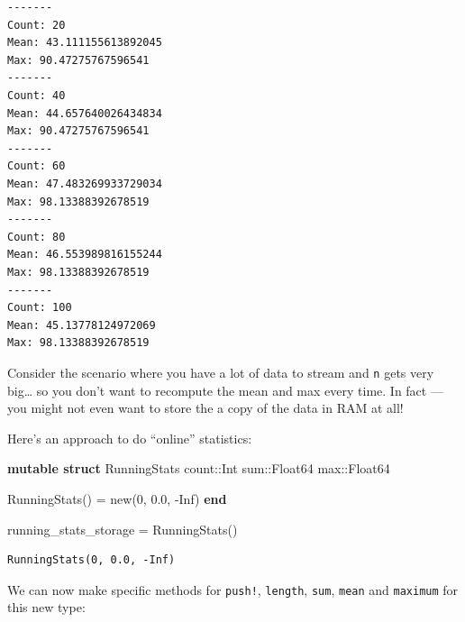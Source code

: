 \documentclass[
]{article}
\newenvironment{Shaded}{\begin{snugshade}}{\end{snugshade}}
\newcommand{\ConstantTok}[1]{\textcolor[rgb]{0.56,0.35,0.01}{#1}}
\newcommand{\DataTypeTok}[1]{\textcolor[rgb]{0.68,0.00,0.00}{#1}}
\newcommand{\FloatTok}[1]{\textcolor[rgb]{0.68,0.00,0.00}{#1}}
\newcommand{\FunctionTok}[1]{\textcolor[rgb]{0.28,0.35,0.67}{#1}}
\newcommand{\KeywordTok}[1]{\textcolor[rgb]{0.00,0.23,0.31}{\textbf{#1}}}
\newcommand{\NormalTok}[1]{\textcolor[rgb]{0.00,0.23,0.31}{#1}}
\newcommand{\OperatorTok}[1]{\textcolor[rgb]{0.37,0.37,0.37}{#1}}
\begin{document}
\begin{verbatim}
-------
Count: 20
Mean: 43.111155613892045
Max: 90.47275767596541
-------
Count: 40
Mean: 44.657640026434834
Max: 90.47275767596541
-------
Count: 60
Mean: 47.483269933729034
Max: 98.13388392678519
-------
Count: 80
Mean: 46.553989816155244
Max: 98.13388392678519
-------
Count: 100
Mean: 45.13778124972069
Max: 98.13388392678519
\end{verbatim}

Consider the scenario where you have a lot of data to stream and
\texttt{n} gets very big\ldots{} so you don't want to recompute the mean
and max every time. In fact --- you might not even want to store the a
copy of the data in RAM at all!

Here's an approach to do ``online'' statistics:

\begin{Shaded}
\begin{Highlighting}[]
\KeywordTok{mutable struct}\NormalTok{ RunningStats}
\NormalTok{   count}\OperatorTok{::}\DataTypeTok{Int}
\NormalTok{   sum}\OperatorTok{::}\DataTypeTok{Float64}
\NormalTok{   max}\OperatorTok{::}\DataTypeTok{Float64}

   \FunctionTok{RunningStats}\NormalTok{() }\OperatorTok{=} \FunctionTok{new}\NormalTok{(}\FloatTok{0}\NormalTok{, }\FloatTok{0.0}\NormalTok{, }\OperatorTok{{-}}\ConstantTok{Inf}\NormalTok{)}
\KeywordTok{end}

\NormalTok{running\_stats\_storage }\OperatorTok{=} \FunctionTok{RunningStats}\NormalTok{()}
\end{Highlighting}
\end{Shaded}

\begin{verbatim}
RunningStats(0, 0.0, -Inf)
\end{verbatim}

We can now make specific methods for \texttt{push!}, \texttt{length},
\texttt{sum}, \texttt{mean} and \texttt{maximum} for this new type:
\end{document}
